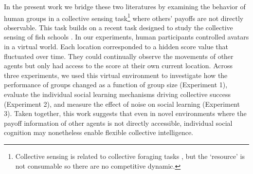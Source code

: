 \documentclass[12pt,letterpaper]{article}
\begin{document}
In the present work we bridge these two literatures by examining the behavior of human groups in a collective sensing task\footnote{Collective sensing is related to collective foraging tasks \cite{dechaume2005hidden,goldstone2005knowledge}, but the ‘resource’ is not consumable so there are no competitive dynamic.} where others' payoffs are not directly observable.  
This task builds on a recent task designed to study the collective sensing of fish schools  \cite{berdahl_emergent_2013}.
In our experiments, human participants controlled avatars in a virtual world.
Each location corresponded to a hidden score value that fluctuated over time.
They could continually observe the movements of other agents but only had access to the score at their own current location. 
Across three experiments, we used this virtual environment to investigate how the performance of groups changed as a function of group size (Experiment 1), evaluate the individual social learning mechanisms driving collective success (Experiment 2), and measure the effect of noise on social learning (Experiment 3).
Taken together, this work suggests that even in novel environments where the payoff information of other agents is not directly accessible, individual social cognition may nonetheless enable flexible collective intelligence. 
\end{document}

